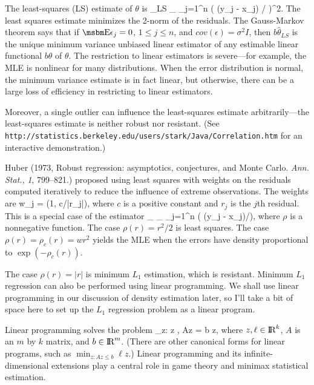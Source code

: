 The least-squares (LS) estimate of $\theta$ is
\beq
    \hat{\theta}_{LS} \equiv
    \arg \min_{\gamma \in \Theta} \sum_{j=1}^n \left ( (y_j - x_j\gamma) / \sigma \right )^2.
\eeq
The least squares estimate minimizes the 2-norm of the residuals.
The Gauss-Markov theorem says that if $\EE \epsilon_j = 0$, $1 \le j \le n$, and
$cov(\epsilon) = \sigma^2 I$, then $b\hat{\theta}_{LS}$ is
the unique minimum variance unbiased linear estimator
of any estimable linear functional $b\theta$ of $\theta$.
The restriction to linear estimators is severe---for example,
the MLE is nonlinear for many distributions.
When the error distribution is normal, the minimum variance estimate
is in fact linear, but otherwise, there can be a large loss of efficiency in
restricting to linear estimators.

Moreover, a single outlier can influence the least-squares estimate arbitrarily---the least-squares
estimate is neither robust nor resistant.
(See {\tt http://statistics.berkeley.edu/users/stark/Java/Correlation.htm\/}
for an interactive demonstration.)

Huber (1973, Robust regression: asymptotics, conjectures, and Monte Carlo.
{\em Ann. Stat.\/}, {\em 1\/}, 799--821.)
proposed using least squares with weights on the residuals computed iteratively
to reduce the influence of extreme observations.
The weights are
\beq
    w_j = \min (1, c/|r_j|),
\eeq
where $c$ is a positive constant and $r_j$ is the $j$th residual.
This is a special case of the estimator
\beq
    \hat{\theta}_{\rho} \equiv \arg \min_{\gamma \in \Theta}
        \sum_{j=1}^n \rho \left ( (y_j - x_j\gamma)/\sigma \right ),
\eeq
where $\rho$ is a nonnegative function.
The case $\rho(r) = r^2/2$ is least squares.
The case $\rho(r) = \rho_c(r) = w r^2$ yields the MLE when the errors have density proportional
to $\exp(-\rho_c(r))$.

The case $\rho(r) = |r|$ is minimum $L_1$ estimation, which is resistant.
Minimum $L_1$ regression can also be performed using linear programming.
We shall use linear programming in our discussion of density estimation
later, so I'll take a bit of space here to set up the $L_1$ regression problem as
a linear program.

Linear programming solves the problem
\beq
    \min_{z: z , Az = b} \ell z,
\eeq
where $z, \ell \in \hbox{I\kern-.17em\hbox{R}}^k$, $A$ is an $m$ by $k$ matrix, and $b \in \hbox{I\kern-.17em\hbox{R}}^m$.
(There are other canonical forms for linear programs, such as
$\min_{z: Az \le b} \ell z$.)
Linear programming and its infinite-dimensional extensions play a central
role in game theory and minimax statistical estimation.

